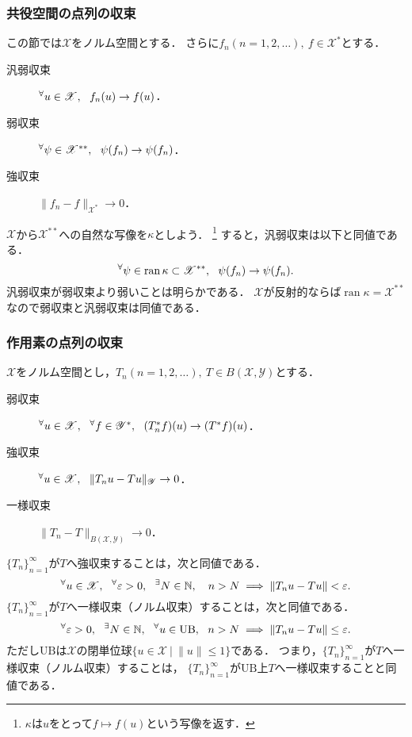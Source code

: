 \documentclass[a4j]{jsarticle}
\newcommand{\ran}{\operatorname{ran}}
\newcommand{\spX}{\mathscr{X}}
\newcommand{\spY}{\mathscr{Y}}
\newcommand{\spB}[2]{B(\mathscr{#1}, \mathscr{#2})}
\begin{document}
    \subsubsection{共役空間の点列の収束}
    この節では$\spX$をノルム空間とする．
    さらに$f_n (n=1,2,\dots),~ f \in \spX^*$とする．
    \begin{description}
        \item[汎弱収束] $\Forall{u \in \spX} f_n(u) \to f(u)$．
        \item[弱収束]\hspace{0.6em} $\Forall{\psi \in \spX^{**}} \psi(f_n) \to \psi(f_n)$．
        \item[強収束]\hspace{0.6em} $\|f_n-f\|_{\spX^*} \to 0$．
    \end{description}
    $\spX$から$\spX^{**}$への自然な写像を$\kappa$としよう．
    \footnote{$\kappa$は$u$をとって$f \mapsto f(u)$という写像を返す．}
    すると，汎弱収束は以下と同値である．
    \[ \Forall{\psi \in \ran \kappa \subset \spX^{**}} \psi(f_n) \to \psi(f_n). \]
    汎弱収束が弱収束より弱いことは明らかである．
    $\spX$が反射的ならば$\ran \kappa=\spX^{**}$なので弱収束と汎弱収束は同値である．
        
    \subsubsection{作用素の点列の収束}
    $\spX$をノルム空間とし，$T_n (n=1,2,\dots),~ T \in \spB{X}{Y}$とする．
    \begin{description}
        \item[弱収束]\hspace{0.6em} $\Forall{u \in \spX} \Forall{f \in \spY^*} (T_n^*f)(u) \to (T^*f)(u)$．
        \item[強収束]\hspace{0.6em} $\Forall{u \in \spX} \|T_n u-T u\|_{\spY} \to 0$．
        \item[一様収束] $\|T_n-T\|_{\spB{X}{Y}} \to 0$．
    \end{description}
    $\{T_n\}_{n=1}^{\infty}$が$T$へ強収束することは，次と同値である．
    \[ \Forall{u \in \spX} \Forall{\varepsilon>0} \Exists{N \in \N}~ n>N \implies \| T_n u-T u \| < \varepsilon. \]
    $\{T_n\}_{n=1}^{\infty}$が$T$へ一様収束（ノルム収束）することは，次と同値である．
    \[ {}^{\forall} \varepsilon>0,~~ {}^{\exists} N \in \mathbb{N},~~ {}^{\forall} u \in \mathrm{UB},~~ n>N \implies \| T_n u-T u \| \leq \varepsilon. \]
    ただし$\mathrm{UB}$は$\spX$の閉単位球$\{u \in \spX ~|~ \|u\| \leq 1\}$である．
    つまり，$\{T_n\}_{n=1}^{\infty}$が$T$へ一様収束（ノルム収束）することは，
    $\{T_n\}_{n=1}^{\infty}$が$\mathrm{UB}$上$T$へ一様収束することと同値である．
\end{document}
